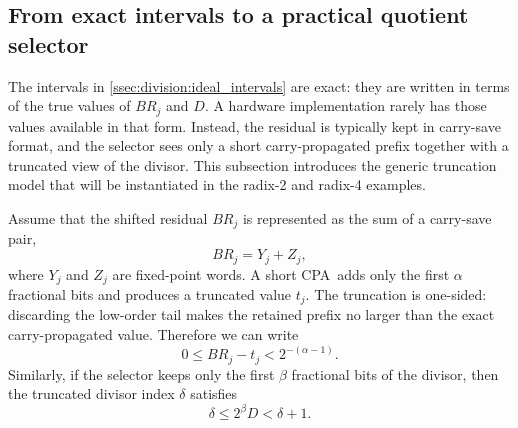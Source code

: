 \documentclass[11pt]{article}
\newcommand{\CPA}{\textsc{CPA}}
\numberwithin{equation}{section}
\begin{document}
\subsection{From exact intervals to a practical quotient selector}
\label{ssec:division:practical_selector}

The intervals in \cref{ssec:division:ideal_intervals} are exact: they are written in terms of the
true values of $BR_j$ and $D$.
A hardware implementation rarely has those values available in that form.
Instead, the residual is typically kept in carry-save format, and the selector sees only a short
carry-propagated prefix together with a truncated view of the divisor.
This subsection introduces the generic truncation model that will be instantiated in the radix-2
and radix-4 examples.

Assume that the shifted residual $BR_j$ is represented as the sum of a carry-save pair,
\begin{equation}
  \label{eq:division:cs_generic}
  BR_j = Y_j + Z_j,
\end{equation}
where $Y_j$ and $Z_j$ are fixed-point words.
A short \CPA\ adds only the first $\alpha$ fractional bits and produces a truncated value $t_j$.
The truncation is one-sided: discarding the low-order tail makes the retained prefix no larger than
the exact carry-propagated value.
Therefore we can write
\begin{equation}
  \label{eq:division:trunc_error_generic}
  0 \le BR_j - t_j < 2^{-(\alpha-1)}.
\end{equation}
Similarly, if the selector keeps only the first $\beta$ fractional bits of the divisor, then the
truncated divisor index $\delta$ satisfies
\begin{equation}
  \label{eq:division:divisor_trunc_generic}
  \delta \le 2^{\beta}D < \delta + 1.
\end{equation}
\end{document}
